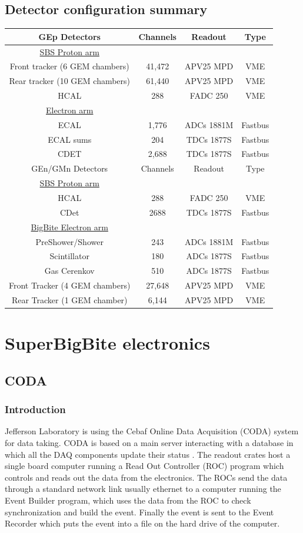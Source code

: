\documentclass{article}
\begin{document}
 


\subsection{Detector configuration summary}
\begin{table}
\begin{tabular}{|c|c|c|c|}
\hline
GEp Detectors & Channels& Readout & Type \\
\hline
\underline{SBS Proton arm} & & & \\
Front tracker (6 GEM chambers) & 41,472 & APV25 MPD& VME\\
Rear tracker (10 GEM chambers) & 61,440& APV25 MPD& VME\\
HCAL & 288 & FADC 250 &VME\\
\hline
\underline{Electron arm} & & & \\
ECAL & 1,776 & ADCs 1881M &Fastbus\\
ECAL sums& 204 & TDCs 1877S &Fastbus\\
CDET & 2,688 & TDCs 1877S &Fastbus \\
\hline
\hline
GEn/GMn Detectors & Channels& Readout & Type \\
\hline
\underline{SBS Proton arm} & & & \\
HCAL & 288 & FADC 250 &VME\\
CDet & 2688 & TDCs 1877S&Fastbus\\
\hline
\underline{BigBite Electron arm} & & & \\
PreShower/Shower & 243 & ADCs 1881M&Fastbus\\
Scintillator & 180& ADCs 1877S&Fastbus\\
Gas Cerenkov & 510& ADCs 1877S&Fastbus\\
Front Tracker (4 GEM chambers) & 27,648 & APV25 MPD &VME\\
Rear Tracker (1 GEM chamber) & 6,144& APV25 MPD &VME\\
\hline
\end{tabular}
\end{table}

\section{SuperBigBite electronics}
\subsection{CODA}
\subsubsection{Introduction}
Jefferson Laboratory is using the Cebaf Online Data Acquisition (CODA) \cite{CODAman} system for data taking.
CODA is based on a main server interacting with a database in which all the DAQ components update their status . The readout crates host a single board computer running a Read Out Controller (ROC) program which controls and reads out the data from the electronics. The ROCs send the data through a standard network link usually ethernet to a computer running the Event Builder program, which uses the data from the ROC to check synchronization and build the event. Finally the event is sent to the Event Recorder which puts the event into a file on the hard drive of the computer. 
\end{document}
